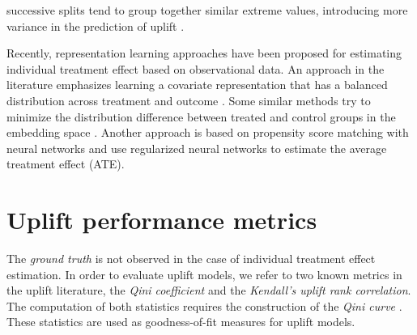 \documentclass{article}
\begin{document}
successive splits tend to group together similar extreme values, introducing more variance in the prediction of uplift \citep{zhao2017practically}.

Recently, representation learning approaches have been proposed for estimating individual treatment effect based on observational data. An approach in the literature emphasizes learning a covariate representation that has a balanced distribution across treatment and outcome \citep{johansson2016learning}. Some similar methods try to minimize the distribution difference between treated and control groups in the embedding space \citep{shalit2017estimating, yao2018representation}. Another approach is based on propensity score matching \citep{rosenbaum1983central} with neural networks \citep{alaa2017deep, schwab2018perfect} and \citep{shi2019adapting} use regularized neural networks to estimate the average treatment effect (ATE).

\section{Uplift performance metrics}
\label{sec:metrics}

The \textit{ground truth} is not observed in the case of individual treatment effect estimation. In order to evaluate uplift models, we refer to two known metrics in the uplift literature, the {\it Qini coefficient} and the {\it Kendall's uplift rank correlation}. The computation of both statistics requires the construction of the {\it Qini curve} \citep{radcliffe2007using}. These statistics are used as goodness-of-fit measures for uplift models.
\end{document}
